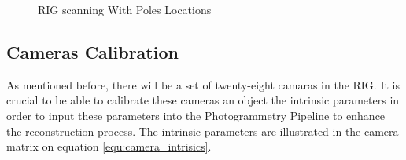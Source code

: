 \documentclass[12pt]{report}
\begin{document}
\begin{figure}[H]
  \centering
  \qquad
  \caption{RIG scanning With Poles Locations}
  \label{fig:RIG}
\end{figure}

\newpage
\subsection{Cameras Calibration}
As mentioned before, there will be a set of twenty-eight camaras in the RIG. 
It is crucial to be able to calibrate these cameras an object the intrinsic parameters in order to input these parameters into the Photogrammetry Pipeline to enhance
the reconstruction process. The intrinsic parameters are illustrated in the camera  matrix on equation \ref{equ:camera_intrisics}.
\end{document}
